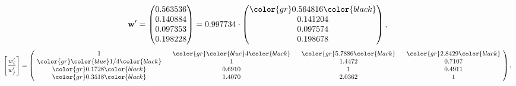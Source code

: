 \begin{example}
\begin{equation*}
\mathbf{w}^{\prime} =
\begin{pmatrix}
0.563536\\
0.140884\\
0.097353\\
0.198228
\end{pmatrix} =
0.997734\cdot
\begin{pmatrix}
\color{gr} 0.564816\color{black} \\
0.141204\\
0.097574\\
0.198678
\end{pmatrix},
\end{equation*}
\begin{equation*}
\left[ \frac{{w}^{\prime}_i}{{w}^{\prime}_j} \right] =
\begin{pmatrix}
$\,\,$ 1 $\,\,$ & $\,\,$\color{gr} \color{blue} 4\color{black} $\,\,$ & $\,\,$\color{gr} 5.7886\color{black} $\,\,$ & $\,\,$\color{gr} 2.8429\color{black} $\,\,$ \\
$\,\,$\color{gr} \color{blue}  1/4\color{black} $\,\,$ & $\,\,$ 1 $\,\,$ & $\,\,$1.4472$\,\,$ & $\,\,$0.7107  $\,\,$ \\
$\,\,$\color{gr} 0.1728\color{black} $\,\,$ & $\,\,$0.6910$\,\,$ & $\,\,$ 1 $\,\,$ & $\,\,$0.4911 $\,\,$ \\
$\,\,$\color{gr} 0.3518\color{black} $\,\,$ & $\,\,$1.4070$\,\,$ & $\,\,$2.0362$\,\,$ & $\,\,$ 1  $\,\,$ \\
\end{pmatrix},
\end{equation*}
\end{example}
\newpage
